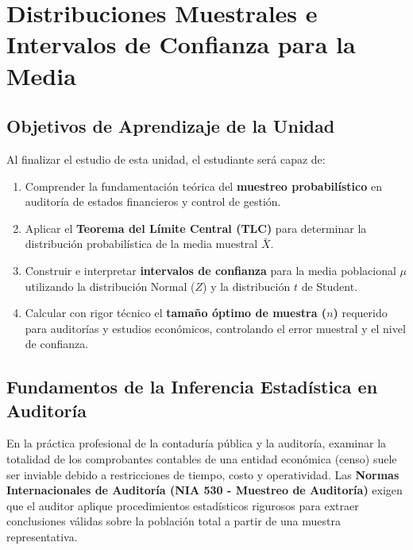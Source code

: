 \chapter{Distribuciones Muestrales e Intervalos de Confianza para la Media}
\label{cap:muestreo_intervalos}

\section*{Objetivos de Aprendizaje de la Unidad}
Al finalizar el estudio de esta unidad, el estudiante será capaz de:
\begin{enumerate}
    \item Comprender la fundamentación teórica del \textbf{muestreo probabilístico} en auditoría de estados financieros y control de gestión.
    \item Aplicar el \textbf{Teorema del Límite Central (TLC)} para determinar la distribución probabilística de la media muestral $\bar{X}$.
    \item Construir e interpretar \textbf{intervalos de confianza} para la media poblacional $\mu$ utilizando la distribución Normal ($Z$) y la distribución $t$ de Student.
    \item Calcular con rigor técnico el \textbf{tamaño óptimo de muestra ($n$)} requerido para auditorías y estudios económicos, controlando el error muestral y el nivel de confianza.
\end{enumerate}

\section{Fundamentos de la Inferencia Estadística en Auditoría}
En la práctica profesional de la contaduría pública y la auditoría, examinar la totalidad de los comprobantes contables de una entidad económica (censo) suele ser inviable debido a restricciones de tiempo, costo y operatividad. Las \textbf{Normas Internacionales de Auditoría (NIA 530 - Muestreo de Auditoría)} exigen que el auditor aplique procedimientos estadísticos rigurosos para extraer conclusiones válidas sobre la población total a partir de una muestra representativa.

